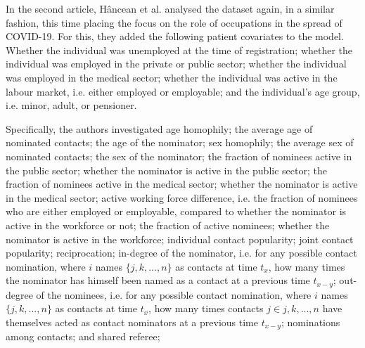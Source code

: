 \bigskip

In the second article, H\^ancean et al. analysed the dataset again, in a similar fashion, this time placing the focus on the role of occupations in the spread of COVID-19. For this, they added the following patient covariates to the model. Whether the individual was unemployed at the time of registration; whether the individual was employed in the private or public sector; whether the individual was employed in the medical sector; whether the individual was active in the labour market, i.e. either employed or employable; and the individual's age group, i.e. minor, adult, or pensioner.

Specifically, the authors investigated age homophily; the average age of nominated contacts; the age of the nominator; sex homophily; the average sex of nominated contacts; the sex of the nominator; the fraction of nominees active in the public sector; whether the nominator is active in the public sector; the fraction of nominees active in the medical sector; whether the nominator is active in the medical sector; active working force difference, i.e. the fraction of nominees who are either employed or employable, compared to whether the nominator is active in the workforce or not; the fraction of active nominees; whether the nominator is active in the workforce; individual contact popularity; joint contact popularity; reciprocation; in-degree of the nominator, i.e. for any possible contact nomination, where $i$ names $\{j,k,...,n\}$ as contacts at time $t_x$, how many times the nominator has himself been named as a contact at a previous time $t_{x-y}$; out-degree of the nominees, i.e. for any possible contact nomination, where $i$ names $\{j,k,...,n\}$ as contacts at time $t_x$, how many times contacts $j \in {j,k,...,n}$ have themselves acted as contact nominators at a previous time $t_{x-y}$; nominations among contacts; and shared referee;


